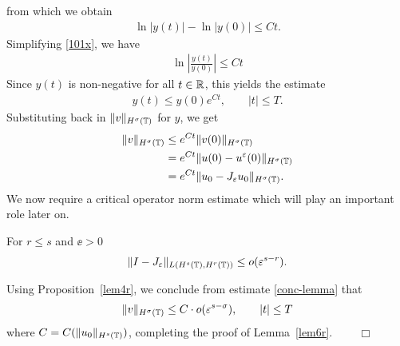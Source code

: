 from which we obtain
\begin{equation}
\begin{split}
\ln |y(t) | - \ln |y(0)| \le C t.
\label{101x}
\end{split}
\end{equation}
Simplifying \eqref{101x}, we have
\begin{equation*}
\begin{split}
\ln \left |\frac{y(t)}{y(0)} \right | \le C t
\end{split}
\end{equation*}
Since $y(t)$ is non-negative for all $t \in \mathbb{R}$, this yields the estimate
\begin{equation*}
\begin{split}
y(t) \le y(0) e^{C t}, \qquad |t| \le T.
\end{split}
\end{equation*}
Substituting back in $\|v\|_{H^{\sigma}(\mathbb{T})}$ for $y$, we get
\begin{equation}
\label{conc-lemma}
\begin{split}
\|v\|_{H^{\sigma}(\mathbb{T})}
& \le e^{C t}\|v(0)\|_{H^{\sigma}(\mathbb{T})}
\\
& = e^{C t}\|u(0) - u^\varepsilon(0) \|_{H^{\sigma}(\mathbb{T})}
\\
& = e^{C t}\|u_0 - J_\varepsilon u_0 \|_{H^{\sigma}(\mathbb{T})}.
\end{split}
\end{equation}
We now require a critical operator norm estimate which will play an
important role later on.
\begin{proposition}
\label{lem4r}
For $r \le s$ and $\ee>0$
\begin{equation}
\label{0r}
\begin{split}
\|I - J_\varepsilon\|_{L(H^s(\mathbb{T}), H^r(\mathbb{T}))} \le o(\varepsilon^{s-r}).
\end{split}
\end{equation}
\end{proposition}
Using Proposition~\ref{lem4r}, we conclude from estimate \eqref{conc-lemma} that
\begin{equation*}
\begin{split}
\|v\|_{H^{\sigma}(\mathbb{T})} \le C \cdot o(\varepsilon^{s - \sigma}), \qquad |t|
\le T
\end{split}
\end{equation*}
where $C=C(\|u_0\|_{H^s(\mathbb{T})})$, completing the proof of Lemma~\ref{lem6r}.
$\qquad \Box$
%
